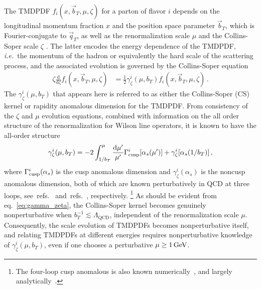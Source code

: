 \documentclass[11pt,a4paper]{article}
\DeclareRobustCommand{\eq}[1]{eq.~\eqref{eq:#1}}
\DeclareRobustCommand{\mycites}[1]{refs.~\cite{#1}}
\newcommand{\df}{\mathrm{d}}
\newcommand{\as}{\alpha_s}
\newcommand{\LQCD}{\Lambda_\mathrm{QCD}}
\newcommand{\bt}{\vec b_T}
\newcommand{\qt}{\vec q_T}
\newcommand{\GammaC}{\Gamma_{\rm cusp}}
\begin{document}
The TMDPDF $f_i(x,\bt,\mu,\zeta)$ for a parton of flavor $i$ depends on the longitudinal momentum fraction $x$ and the position space parameter $\bt$, which is Fourier-conjugate to $\qt$, as well as the renormalization scale $\mu$ and the Collins-Soper scale $\zeta$ \cite{Collins:1981va,Collins:1981uk}.
The latter encodes the energy dependence of the TMDPDF, {\it i.e.}\ the momentum of the hadron or equivalently the hard scale of the scattering process, and the associated evolution is governed by the Collins-Soper equation \cite{Collins:1981va,Collins:1981uk}
\begin{align}
 \zeta \frac{\df}{\df\zeta} f_i(x, \bt, \mu, \zeta) &
= \frac{1}{2} \gamma^i_\zeta(\mu,b_T) f_i(x, \bt, \mu, \zeta)
\,.\end{align}
The $\gamma^i_\zeta(\mu,b_T)$ that appears here is referred to as either the Collins-Soper (CS) kernel or rapidity anomalous dimension for the TMDPDF.  From consistency of the $\zeta$ and $\mu$ evolution equations, combined with information on the all order structure of the renormalization for Wilson line operators, it is known to have
the all-order structure
\begin{align} \label{eq:gamma_zeta}
 \gamma_\zeta^i(\mu,b_T) = -2 \int_{1/b_T}^\mu \frac{\df\mu'}{\mu'} \GammaC^i[\as(\mu')] + \gamma_\zeta^i[\as(1/b_T)]
\,,\end{align}
where $\GammaC^i(\as)$ is the cusp anomalous dimension and $\gamma_\zeta^i(\as)$ is the noncusp anomalous dimension,
both of which are known perturbatively in QCD at three loops, see~\mycites{Korchemsky:1987wg, Moch:2004pa, Vogt:2004mw} and~\mycites{Davies:1984hs,Davies:1984sp,deFlorian:2000pr,Becher:2010tm,Gehrmann:2014yya,Echevarria:2015byo,Luebbert:2016itl,Li:2016axz,Li:2016ctv,Vladimirov:2016dll}, respectively.%
\footnote{The four-loop cusp anomalous is also known numerically~\cite{Moch:2017uml, Moch:2018wjh}, and largely analytically~\cite{Grozin:2016ydd, Henn:2016men, Davies:2016jie, Lee:2016ixa, Grozin:2018vdn,  Lee:2019zop, Henn:2019rmi, Bruser:2019auj}.}
As should be evident from \eq{gamma_zeta}, the Collins-Soper kernel becomes genuinely nonperturbative when $b_T^{-1} \lesssim \LQCD$,
independent of the renormalization scale $\mu$.
Consequently, the scale evolution of TMDPDFs becomes nonperturbative itself, and relating TMDPDFs at different energies requires nonperturbative knowledge of $\gamma_\zeta^i(\mu,b_T)$, even if one chooses a perturbative $\mu\ge 1\,{\rm GeV}$. 
\end{document}
